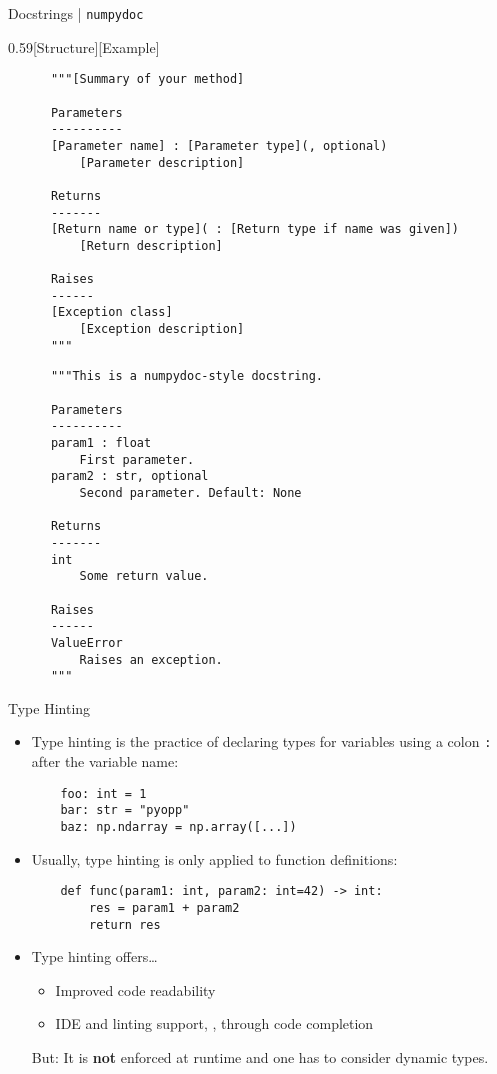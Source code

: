 \begin{frame}[fragile]{%
    Docstrings | \texttt{numpydoc}
    \hfill
  }
  \begin{CodeExplanation}{0.59}[Structure][Example]
    \footnotesize
    \begin{verbatim}
      """[Summary of your method]

      Parameters
      ----------
      [Parameter name] : [Parameter type](, optional)
          [Parameter description]

      Returns
      -------
      [Return name or type]( : [Return type if name was given])
          [Return description]

      Raises
      ------
      [Exception class]
          [Exception description]
      """
    \end{verbatim}
    \Explanation
    \footnotesize
    \begin{verbatim}
      """This is a numpydoc-style docstring.

      Parameters
      ----------
      param1 : float
          First parameter.
      param2 : str, optional
          Second parameter. Default: None

      Returns
      -------
      int
          Some return value.

      Raises
      ------
      ValueError
          Raises an exception.
      """
    \end{verbatim}
  \end{CodeExplanation}
\end{frame}

\begin{frame}[fragile]{
    Type Hinting
    \hfill
  }
  \begin{itemize}
    \setlength{\itemsep}{1.5em}
    \item Type hinting is the practice of declaring types for variables using a colon \texttt{:}
  after the variable name:
  \begin{verbatim}
    foo: int = 1
    bar: str = "pyopp"
    baz: np.ndarray = np.array([...])
  \end{verbatim}

  \item Usually, type hinting is only applied to function definitions:
  \begin{verbatim}
    def func(param1: int, param2: int=42) -> int:
        res = param1 + param2
        return res
  \end{verbatim}

  \item Type hinting offers\dots
  \begin{itemize}
    \item Improved code readability
    \item IDE and linting support, \eg{}, through code completion
  \end{itemize}
  But: It is \textbf{not} enforced at runtime and one has to consider dynamic types.
  \end{itemize}
\end{frame}
